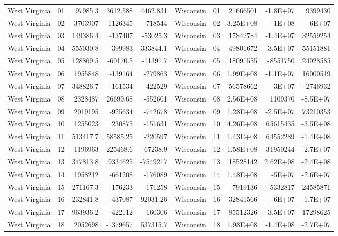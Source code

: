 \begin{landscape}
\begin{singlespace}
\begin{longtable}{lrrrr|lrrrr}
		West Virginia &  01  & 97985.3 & 3612.588 & 4462.831 & Wisconsin &  01  & 21666501 & -1.8E+07 & 9399430 \\
		West Virginia &  02  & 3703907 & -1126345 & -718544 & Wisconsin &  02  & 3.25E+08 & -1E+08 & -6E+07 \\
		West Virginia &  03  & 149386.4 & -137407 & -53025.3 & Wisconsin &  03  & 17842784 & -1.4E+07 & 32559254 \\
		West Virginia &  04  & 555030.8 & -399983 & 333844.1 & Wisconsin &  04  & 49801672 & -3.5E+07 & 55151881 \\
		West Virginia &  05  & 128869.5 & -60170.5 & -11391.7 & Wisconsin &  05  & 18091555 & -8551750 & 24028585 \\
		West Virginia &  06  & 1955848 & -139164 & -279863 & Wisconsin &  06  & 1.99E+08 & -1.1E+07 & 16000519 \\
		West Virginia &  07  & 348826.7 & -161534 & -422529 & Wisconsin &  07  & 56578662 & -3E+07 & -2746932 \\
		West Virginia &  08  & 2328487 & 26699.68 & -552601 & Wisconsin &  08  & 2.56E+08 & 1109370 & -8.5E+07 \\
		West Virginia &  09  & 2019195 & -925634 & -742678 & Wisconsin &  09  & 1.28E+08 & -2.5E+07 & 73210353 \\
		West Virginia &  10 & 1255023 & 230875 & -151631 & Wisconsin &  10 & 4.26E+08 & 65615435 & -3.5E+08 \\
		West Virginia &  11 & 513417.7 & 58585.25 & -220597 & Wisconsin &  11 & 1.43E+08 & 64552289 & -1.4E+08 \\
		West Virginia &  12 & 1196963 & 225468.6 & -67238.9 & Wisconsin &  12 & 1.58E+08 & 31950244 & -2.7E+07 \\
		West Virginia &  13 & 347813.8 & 9334625 & -7549217 & Wisconsin &  13 & 18528142 & 2.62E+08 & -2.4E+08 \\
		West Virginia &  14 & 1958212 & -661208 & -176089 & Wisconsin &  14 & 1.48E+08 & -5E+07 & -2.6E+07 \\
		West Virginia &  15 & 271167.3 & -176233 & -171258 & Wisconsin &  15 & 7919136 & -5332817 & 24585871 \\
		West Virginia &  16 & 232841.8 & -437087 & 92031.26 & Wisconsin &  16 & 32841566 & -6E+07 & -1.7E+07 \\
		West Virginia &  17 & 963936.2 & -422112 & -160306 & Wisconsin &  17 & 85512326 & -3.5E+07 & 17298625 \\
		West Virginia &  18 & 2052698 & -1379657 & 537315.7 & Wisconsin &  18 & 1.98E+08 & -1.4E+08 & -2.7E+07 \\

\end{longtable}
\end{singlespace}
\end{landscape}
